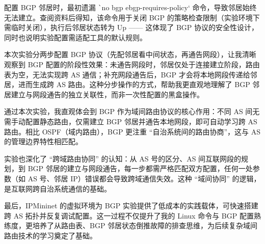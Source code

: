 \documentclass[12pt, a4paper]{ctexart}
\begin{document}
配置 BGP 邻居时，最初遗漏 \texttt`no bgp ebgp-requires-policy` 命令，导致邻居始终无法建立。查阅资料后得知，该命令用于关闭 BGP 的策略检查限制（实验环境下需临时关闭），执行后邻居状态转为 Up —— 这体现了 BGP 协议的安全性设计，同时也说明实验配置需适配工具的默认规则。

本次实验分两步配置 BGP 协议（先配邻居看中间状态，再通告网段），让我清晰观察到 BGP 配置的阶段性效果：未通告网段时，邻居仅处于连接建立阶段，路由表为空，无法实现跨 AS 通信；补充网段通告后，BGP 才会将本地网段传递给邻居，进而生成跨 AS 路由。这种分步操作的方式，帮助我更直观地理解了 BGP 邻居建立与网段通告的独立关联性，而非一次性配置的黑盒操作。

通过本次实验，我直观体会到 BGP 作为域间路由协议的核心作用：不同 AS 间无需手动配置静态路由，仅需建立 BGP 邻居并通告本地网段，即可自动学习跨 AS 路由。相比 OSPF（域内路由），BGP 更注重 “自治系统间的路由协商”，这与 AS 的管理边界特性相匹配。

实验也深化了 “跨域路由协同” 的认知：从 AS 号的区分、AS 间互联网段的规划，到 BGP 邻居的建立与网段通告，每一步都需严格匹配双方配置，任何一处参数（如 AS 号、邻居 IP）错误都会导致跨域通信失效。这种 “域间协同” 的逻辑，是互联网跨自治系统通信的基础。

最后，IPMininet 的虚拟环境为 BGP 实验提供了低成本的实践载体，可快速搭建跨 AS 拓扑并反复调试配置。这一过程不仅提升了我的 Linux 命令与 BGP 配置熟练度，更培养了从路由表、BGP 邻居状态倒推故障的排查思维，为后续复杂域间路由技术的学习奠定了基础。
\end{document}
